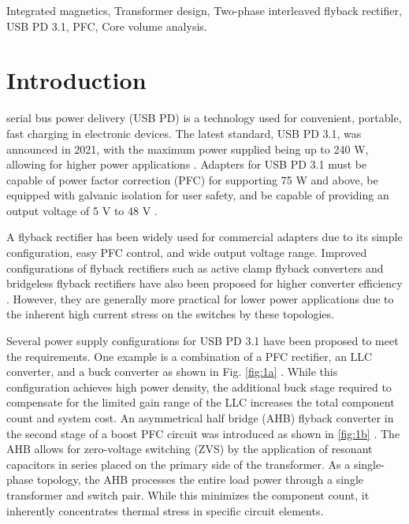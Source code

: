 \documentclass[lettersize,journal]{IEEEtran}
\begin{document}
\begin{IEEEkeywords}
Integrated magnetics, Transformer design, Two-phase interleaved flyback rectifier, USB PD 3.1, PFC, Core volume analysis.
\end{IEEEkeywords}

\section{Introduction}
 serial bus power delivery (USB PD) is a technology used for convenient, portable, fast charging in electronic devices. The latest standard, USB PD 3.1, was announced in 2021, with the maximum power supplied being up to 240 W, allowing for higher power applications \cite{ref1}. Adapters for USB PD 3.1 must be capable of power factor correction (PFC) for supporting 75 W and above, be equipped with galvanic isolation for user safety, and be capable of providing an output voltage of 5 V to 48 V \cite{ref2}.

A flyback rectifier has been widely used for commercial adapters due to its simple configuration, easy PFC control, and wide output voltage range. Improved configurations of flyback rectifiers such as active clamp flyback converters \cite{ref6, ref7} and bridgeless flyback rectifiers have also been proposed for higher converter efficiency \cite{ref8, ref9, ref10, ref11}. However, they are generally more practical for lower power applications due to the inherent high current stress on the switches by these topologies.

Several power supply configurations for USB PD 3.1 have been proposed to meet the requirements. One example is a combination of a PFC rectifier, an LLC converter, and a buck converter as shown in Fig. \ref{fig:1a} \cite{ref3, ref4}. While this configuration achieves high power density, the additional buck stage required to compensate for the limited gain range of the LLC increases the total component count and system cost. An asymmetrical half bridge (AHB) flyback converter in the second stage of a boost PFC circuit was introduced as shown in \ref{fig:1b} \cite{ref5}. The AHB allows for zero-voltage switching (ZVS) by the application of resonant capacitors in series placed on the primary side of the transformer. As a single-phase topology, the AHB processes the entire load power through a single transformer and switch pair. While this minimizes the component count, it inherently concentrates thermal stress in specific circuit elements.
\end{document}
